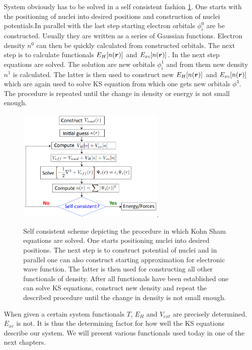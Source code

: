 \documentclass[openany, longbibliography,slovene,a4paper,12pt]{article}
\def\vec#1{\mbox{\boldmath$#1$}}
\begin{document}
System obviously has to be solved in a self consistent fashion
\ref{self_consistent_scheme}. One starts with the positioning of nuclei into
desired positions and construction of nuclei potentials.In parallel with the
last step starting electron orbitals $\phi^0_i$ are be constructed. Usually they are written
as a series of Gaussian functions. Electron density $n^0$ can then be quickly
calculated from constructed orbitals. The next step is to
calculate functionals $E_H[n(\vec r)]$ and $E_{xc}[n(\vec r)]$. In the next step
equations are solved. The solution are new orbitals $\phi_i^1$  and from them new density $n^1$ is calculated. The latter is then used to
construct new $E_H[n(\vec r)]$ and $E_{xc}[n(\vec r)]$ which are again used to
solve KS equation from which one gets new orbitals $\phi^3$. The procedure is
repeated until the change in density or energy is not small enough. 


\begin{figure}
  \centering
  \includegraphics[width=0.65\textwidth]{self_consistent_scheme.png}.
  \caption{Self consistent scheme depicting the procedure in which Kohn Sham
    equations are solved. One starts positioning nuclei into
    desired positions. The next step is to construct potential of nuclei and in
    parallel one can also construct starting approximation for electronic wave
    function. The latter is then used for constructing all other functionals of
    density. After all functionals have been established one can solve KS
    equations, construct new density and repeat the described procedure until
    the change in density is not small enough.
  }
  \label{self_consistent_scheme}
\end{figure}

When given a certain system functionals $T$, $E_H$ and $V_{ext}$ are precisely
determined. $E_{xc}$ is not. It is thus the determining factor for how well the KS
equations describe our system. We will present various functionals used today in
one of the next chapters.
\end{document}
